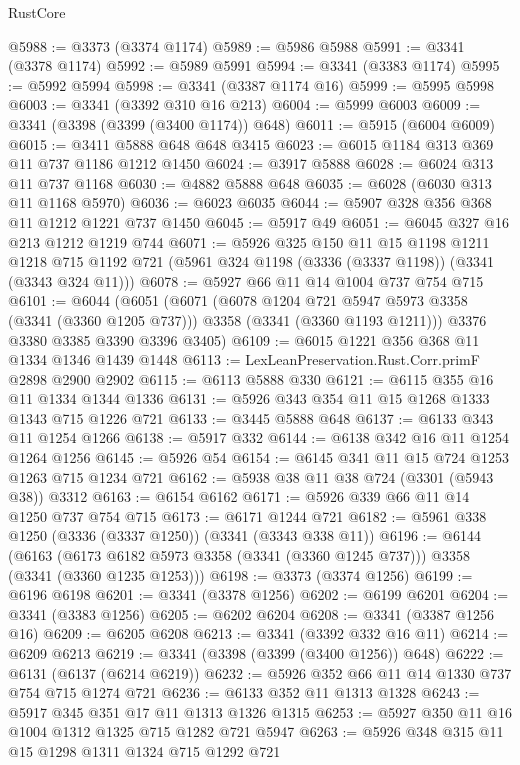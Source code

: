 \begin{lexlean}{RustCore}
\begin{coremodule}
@5988 := @3373 (@3374 @1174)
@5989 := @5986 @5988
@5991 := @3341 (@3378 @1174)
@5992 := @5989 @5991
@5994 := @3341 (@3383 @1174)
@5995 := @5992 @5994
@5998 := @3341 (@3387 @1174 @16)
@5999 := @5995 @5998
@6003 := @3341 (@3392 @310 @16 @213)
@6004 := @5999 @6003
@6009 := @3341 (@3398 (@3399 (@3400 @1174)) @648)
@6011 := @5915 (@6004 @6009)
@6015 := @3411 @5888 @648 @648 @3415
@6023 := @6015 @1184 @313 @369 @11 @737 @1186 @1212 @1450
@6024 := @3917 @5888
@6028 := @6024 @313 @11 @737 @1168
@6030 := @4882 @5888 @648
@6035 := @6028 (@6030 @313 @11 @1168 @5970)
@6036 := @6023 @6035
@6044 := @5907 @328 @356 @368 @11 @1212 @1221 @737 @1450
@6045 := @5917 @49
@6051 := @6045 @327 @16 @213 @1212 @1219 @744
@6071 := @5926
    @325
    @150
    @11
    @15
    @1198
    @1211
    @1218
    @715
    @1192
    @721
    (@5961 @324 @1198 (@3336 (@3337 @1198)) (@3341 (@3343 @324 @11)))
@6078 := @5927 @66 @11 @14 @1004 @737 @754 @715
@6101 := @6044
    (@6051
      (@6071
        (@6078 @1204 @721 @5947 @5973 @3358 (@3341 (@3360 @1205 @737)))
        @3358
        (@3341 (@3360 @1193 @1211)))
      @3376
      @3380
      @3385
      @3390
      @3396
      @3405)
@6109 := @6015 @1221 @356 @368 @11 @1334 @1346 @1439 @1448
@6113 := LexLeanPreservation.Rust.Corr.primF @2898 @2900 @2902
@6115 := @6113 @5888 @330
@6121 := @6115 @355 @16 @11 @1334 @1344 @1336
@6131 := @5926 @343 @354 @11 @15 @1268 @1333 @1343 @715 @1226 @721
@6133 := @3445 @5888 @648
@6137 := @6133 @343 @11 @1254 @1266
@6138 := @5917 @332
@6144 := @6138 @342 @16 @11 @1254 @1264 @1256
@6145 := @5926 @54
@6154 := @6145 @341 @11 @15 @724 @1253 @1263 @715 @1234 @721
@6162 := @5938 @38 @11 @38 @724 (@3301 (@5943 @38)) @3312
@6163 := @6154 @6162
@6171 := @5926 @339 @66 @11 @14 @1250 @737 @754 @715
@6173 := @6171 @1244 @721
@6182 := @5961 @338 @1250 (@3336 (@3337 @1250)) (@3341 (@3343 @338 @11))
@6196 := @6144
    (@6163 (@6173 @6182 @5973 @3358 (@3341 (@3360 @1245 @737))) @3358 (@3341 (@3360 @1235 @1253)))
@6198 := @3373 (@3374 @1256)
@6199 := @6196 @6198
@6201 := @3341 (@3378 @1256)
@6202 := @6199 @6201
@6204 := @3341 (@3383 @1256)
@6205 := @6202 @6204
@6208 := @3341 (@3387 @1256 @16)
@6209 := @6205 @6208
@6213 := @3341 (@3392 @332 @16 @11)
@6214 := @6209 @6213
@6219 := @3341 (@3398 (@3399 (@3400 @1256)) @648)
@6222 := @6131 (@6137 (@6214 @6219))
@6232 := @5926 @352 @66 @11 @14 @1330 @737 @754 @715 @1274 @721
@6236 := @6133 @352 @11 @1313 @1328
@6243 := @5917 @345 @351 @17 @11 @1313 @1326 @1315
@6253 := @5927 @350 @11 @16 @1004 @1312 @1325 @715 @1282 @721 @5947
@6263 := @5926 @348 @315 @11 @15 @1298 @1311 @1324 @715 @1292 @721

\end{coremodule}
\end{lexlean}

